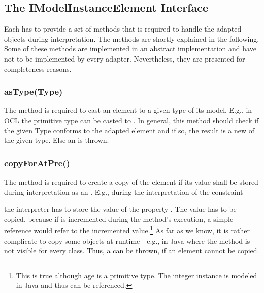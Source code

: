 \subsection{The IModelInstanceElement Interface}

Each  has to provide a set of methods that is
required to handle the adapted objects during interpretation. The methods are
shortly explained in the following. Some of these methods are implemented in an
abstract  implementation and have not to be 
implemented by every adapter. Nevertheless, they are presented for completeness
reasons.

\subsubsection{asType(Type)}

The method  is required to cast an element to a given type of
its model. E.g., in \acs{OCL} the primitive type  can be casted to
. In general, this method should check if the given Type conforms to 
the adapted element and if so, the result is a new  
of the given type. Else an  is thrown.

\subsubsection{copyForAtPre()} 

The method  is required to create a copy of the element if 
its value shall be stored during interpretation as an .
E.g., during the interpretation of the constraint


the interpreter has to store the value of the property . The value has
to be copied, because if  is incremented during the method's
execution, a simple reference would refer to the incremented
value.\footnote{This is true although age is a primitive type. The integer
instance is modeled in Java and thus can be referenced.} As far as we know, it 
is rather complicate to copy some objects at runtime - e.g., in Java where the 
 method is not visible for every class. Thus, a 
 can be thrown, if an element cannot be copied.

